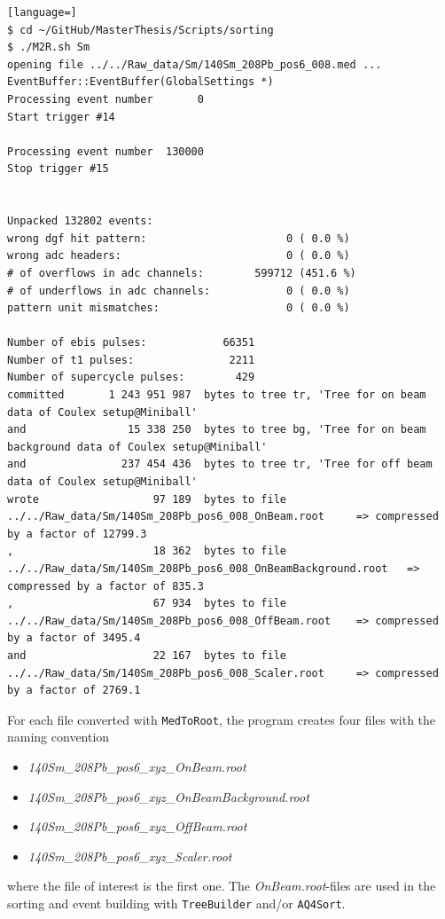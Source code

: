 \documentclass[twoside,english]{uiofysmaster/uiofysmaster}
\begin{document}
\begin{lstlisting}[language=]
$ cd ~/GitHub/MasterThesis/Scripts/sorting
$ ./M2R.sh Sm
opening file ../../Raw_data/Sm/140Sm_208Pb_pos6_008.med ...
EventBuffer::EventBuffer(GlobalSettings *)
Processing event number       0
Start trigger #14

Processing event number  130000
Stop trigger #15


Unpacked 132802 events:
wrong dgf hit pattern:                      0 ( 0.0 %)
wrong adc headers:                          0 ( 0.0 %)
# of overflows in adc channels:        599712 (451.6 %)
# of underflows in adc channels:            0 ( 0.0 %)
pattern unit mismatches:                    0 ( 0.0 %)

Number of ebis pulses:            66351
Number of t1 pulses:               2211
Number of supercycle pulses:        429
committed       1 243 951 987  bytes to tree tr, 'Tree for on beam data of Coulex setup@Miniball'
and                15 338 250  bytes to tree bg, 'Tree for on beam background data of Coulex setup@Miniball'
and               237 454 436  bytes to tree tr, 'Tree for off beam data of Coulex setup@Miniball'
wrote                  97 189  bytes to file ../../Raw_data/Sm/140Sm_208Pb_pos6_008_OnBeam.root 	=> compressed by a factor of 12799.3
,                      18 362  bytes to file ../../Raw_data/Sm/140Sm_208Pb_pos6_008_OnBeamBackground.root 	=> compressed by a factor of 835.3
,                      67 934  bytes to file ../../Raw_data/Sm/140Sm_208Pb_pos6_008_OffBeam.root 	=> compressed by a factor of 3495.4
and                    22 167  bytes to file ../../Raw_data/Sm/140Sm_208Pb_pos6_008_Scaler.root 	=> compressed by a factor of 2769.1
\end{lstlisting}

For each file converted with \texttt{MedToRoot}, the program creates four files with the naming convention
\begin{itemize}
	\item \textit{140Sm\_208Pb\_pos6\_xyz\_OnBeam.root} 
	\item \textit{140Sm\_208Pb\_pos6\_xyz\_OnBeamBackground.root}
	\item \textit{140Sm\_208Pb\_pos6\_xyz\_OffBeam.root}
	\item \textit{140Sm\_208Pb\_pos6\_xyz\_Scaler.root} 
\end{itemize}
where the file of interest is the first one. The \textit{OnBeam.root}-files are used in the sorting and event building with \texttt{TreeBuilder} and/or \texttt{AQ4Sort}.
\end{document}
